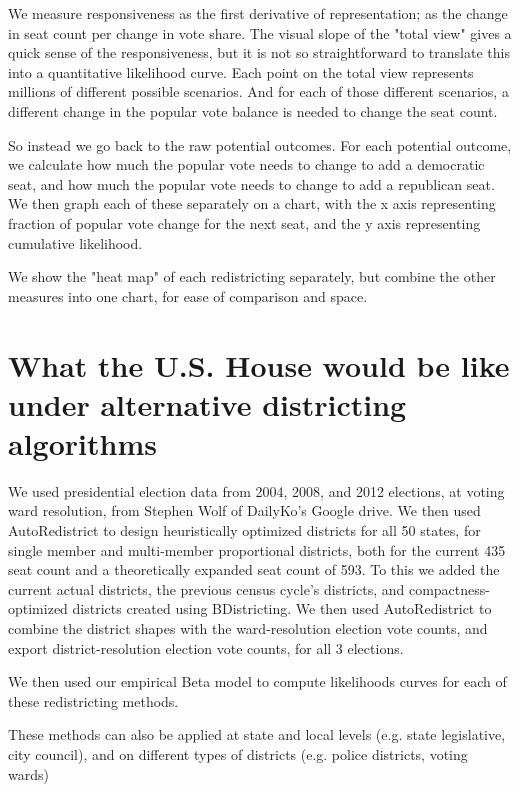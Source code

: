 \documentclass[preprint,12pt]{article}
\begin{document}
We measure responsiveness as the first derivative of representation; as the change in seat count per change in vote share.   The visual slope of the "total view" gives a quick sense of the responsiveness, but it is not so straightforward to translate this into a quantitative likelihood curve.  Each point on the total view represents millions of different possible scenarios.  And for each of those different scenarios, a different change in the popular vote balance is needed to change the seat count. 

So instead we go back to the raw potential outcomes.  For each potential outcome, we calculate how much the popular vote needs to change to add a democratic seat, and how much the popular vote needs to change to add a republican seat.  We then graph each of these separately on a chart, with the x axis representing fraction of popular vote change for the next seat, and the y axis representing cumulative likelihood.

We show the "heat map" of each redistricting separately, but combine the other measures into one chart, for ease of comparison and space.

\section{What the U.S. House would be like under alternative districting algorithms}

We used presidential election data from 2004, 2008, and 2012 elections, at voting ward resolution, from Stephen Wolf of DailyKo's Google drive.  We then used AutoRedistrict to design heuristically optimized districts for all 50 states, for single member and multi-member proportional districts, both for the current 435 seat count and a theoretically expanded seat count of 593.  To this we added the current actual districts, the previous census cycle's districts, and compactness-optimized districts created using BDistricting.   We then used AutoRedistrict to combine the district shapes with the ward-resolution election vote counts, and export district-resolution election vote counts, for all 3 elections.

We then used our empirical Beta model to compute likelihoods curves for each of these redistricting methods. 

These methods can also be applied at state and local levels (e.g. state legislative, city council), and on different types of districts (e.g. police districts, voting wards)
\end{document}
